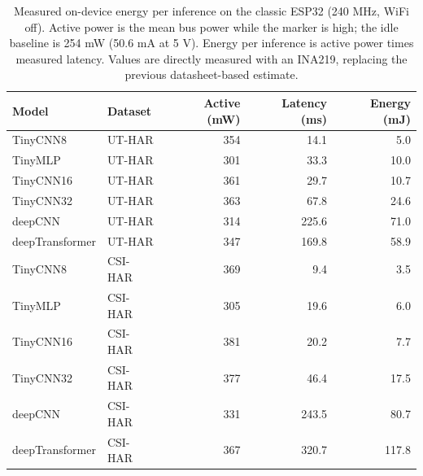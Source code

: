 
\begin{table}[t]
\centering
\caption{Measured on-device energy per inference on the classic ESP32
(240 MHz, WiFi off). Active power is the mean bus power while the marker is high;
the idle baseline is 254 mW (50.6 mA at 5 V). Energy per inference is
active power times measured latency. Values are directly measured with an INA219,
replacing the previous datasheet-based estimate.}
\label{tab:energy}
\begin{tabular}{llrrr}
\hline
Model & Dataset & Active (mW) & Latency (ms) & Energy (mJ) \\
\hline
TinyCNN8        & UT-HAR  & 354 & 14.1  & 5.0 \\
TinyMLP         & UT-HAR  & 301 & 33.3  & 10.0 \\
TinyCNN16       & UT-HAR  & 361 & 29.7  & 10.7 \\
TinyCNN32       & UT-HAR  & 363 & 67.8  & 24.6 \\
deepCNN         & UT-HAR  & 314 & 225.6 & 71.0 \\
deepTransformer & UT-HAR  & 347 & 169.8 & 58.9 \\
\hline
TinyCNN8        & CSI-HAR & 369 & 9.4   & 3.5 \\
TinyMLP         & CSI-HAR & 305 & 19.6  & 6.0 \\
TinyCNN16       & CSI-HAR & 381 & 20.2  & 7.7 \\
TinyCNN32       & CSI-HAR & 377 & 46.4  & 17.5 \\
deepCNN         & CSI-HAR & 331 & 243.5 & 80.7 \\
deepTransformer & CSI-HAR & 367 & 320.7 & 117.8 \\
\hline
\end{tabular}
\end{table}

